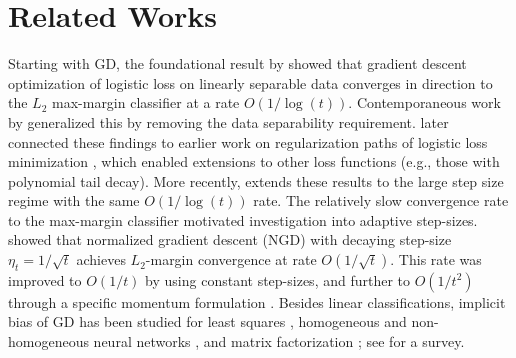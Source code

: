 \section{Related Works}
\label{sec:related work}
Starting with GD,  
the foundational result by \cite{soudry2018implicit} showed that gradient descent optimization of logistic loss on linearly separable data converges in direction to the $L_2$ max-margin classifier at a rate $O(1/\log(t))$. Contemporaneous work by \cite{ji2019implicit} generalized this by removing the data separability requirement. \cite{ji2020gradient} later connected these findings to earlier work on regularization paths of logistic loss minimization \citep{Rosset2003MarginML}, which enabled extensions to other loss functions (e.g., those with polynomial tail decay). More recently, \cite{wu2024implicit} extends these results to the large step size regime with the same $O(1/\log(t))$ rate. The relatively slow convergence rate to the max-margin classifier motivated investigation into adaptive step-sizes. \cite{nacson2019convergence} showed that normalized gradient descent (NGD) with decaying step-size $\eta_t=1/\sqrt{t}$ achieves $L_2$-margin convergence at rate $O(1/\sqrt{t})$. This rate was improved to $O(1/t)$ by \cite{ji2021characterizing} using constant step-sizes, and further to $O(1/t^2)$ through a specific momentum formulation \citep{ji2021fast}. Besides linear classifications, implicit bias of GD has been studied for least squares \citep{gunasekar2017implicit,gunasekar2018characterizing}, homogeneous  \citep{lyu2019gradient,ji2020directional} and non-homogeneous neural networks \citep{wu2024large}, and matrix factorization \citep{gunasekar2017implicit}; see \cite{vardi2023implicit} for a survey.

